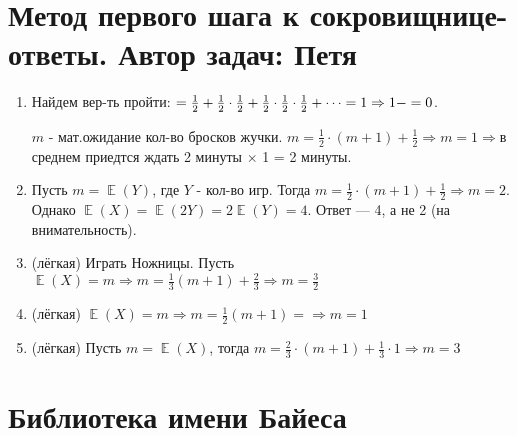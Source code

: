 \documentclass[a4paper,12pt]{article}
\DeclareMathOperator{\E}{\mathbb{E}}
\let\P\relax
\DeclareMathOperator{\P}{\mathbb{P}}
\begin{document}
\newpage

\section{Метод первого шага к сокровищнице-ответы. Автор задач: Петя}


\begin{enumerate}
\item Найдем вер-ть пройти: $\P = \frac{1}{2} + \frac{1}{2} \cdot \frac{1}{2} + \frac{1}{2}\cdot\frac{1}{2}\cdot\frac{1}{2} + \dots  = 1 \Rightarrow 1 - \P = 0$.

$m$ - мат.ожидание кол-во бросков жучки. $m=\frac{1}{2}\cdot(m+1) + \frac{1}{2} \Rightarrow m = 1 \Rightarrow $в среднем приедтся ждать 2 минуты $\times$ 1 = 2 минуты.
\item Пусть $m = \E(Y)$, где $Y$ - кол-во игр. Тогда $m = \frac{1}{2} \cdot (m+1) + \frac{1}{2} \Rightarrow m = 2$. Однако $\E(X) = \E(2Y) = 2 \E(Y) = 4$. Ответ — 4, а не 2 (на внимательность).
\item (лёгкая) Играть Ножницы. Пусть $\E(X) = m \Rightarrow m = \frac{1}{3}(m+1) + \frac{2}{3} \Rightarrow m = \frac{3}{2}$
\item (лёгкая) $\E(X) = m \Rightarrow m = \frac{1}{2}(m+1) =\Rightarrow m = 1$
\item (лёгкая) Пусть $m = \E(X)$, тогда $m = \frac{2}{3}\cdot(m+1) + \frac{1}{3} \cdot 1 \Rightarrow m = 3$
\end{enumerate}

\newpage
\section{Библиотека имени Байеса} %
\end{document}
